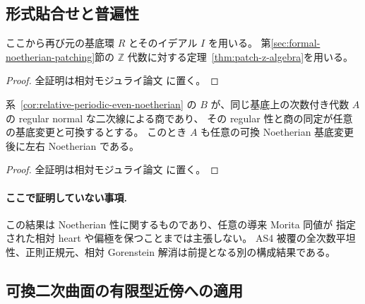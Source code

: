 \subsection{形式貼合せと普遍性}

ここから再び元の基底環 $R$ とそのイデアル $I$ を用いる。
第\ref{sec:formal-noetherian-patching}節の $\mathbb Z$ 代数に対する定理~\ref{thm:patch-z-algebra}を用いる。

\begin{proof}
全証明は相対モジュライ論文 \cite[\texttt{relative_cubic_noetherian}]{QuadricModuli2026} に置く。
\end{proof}

\begin{corollary}[AS4 被覆への帰結]
系~\ref{cor:relative-periodic-even-noetherian} の $B$ が、同じ基底上の次数付き代数 $A$ の regular normal な二次線による商であり、
その regular 性と商の同定が任意の基底変更と可換するとする。
このとき $A$ も任意の可換 Noetherian 基底変更後に左右 Noetherian である。
\end{corollary}

\begin{proof}
全証明は相対モジュライ論文 \cite[\texttt{relative_cubic_noetherian}]{QuadricModuli2026} に置く。
\end{proof}

\paragraph{ここで証明していない事項.}
この結果は Noetherian 性に関するものであり、任意の導来 Morita 同値が
指定された相対 heart や偏極を保つことまでは主張しない。
AS4 被覆の全次数平坦性、正則正規元、相対 Gorenstein 解消は前提となる別の構成結果である。


\subsection{可換二次曲面の有限型近傍への適用}

